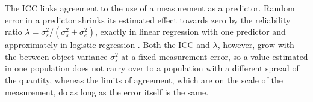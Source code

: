 The ICC links agreement to the use of a measurement as a predictor.
Random error in a predictor shrinks its estimated effect towards zero by the reliability ratio $\lambda = \sigma_s^2 / (\sigma_s^2 + \sigma_e^2)$, exactly in linear regression with one predictor and approximately in logistic regression \cite{hutcheon2010dilution}.
Both the ICC and $\lambda$, however, grow with the between-object variance $\sigma_s^2$ at a fixed measurement error, so a value estimated in one population does not carry over to a population with a different spread of the quantity, whereas the limits of agreement, which are on the scale of the measurement, do as long as the error itself is the same.

